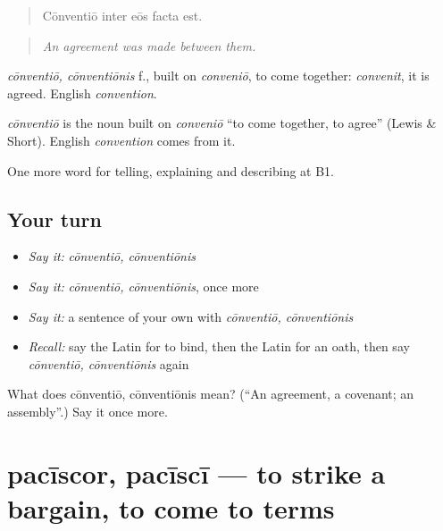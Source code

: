 \begin{quote}
Cōnventiō inter eōs facta est.
\end{quote}

\begin{quote}
\emph{An agreement was made between them.}
\end{quote}

\emph{cōnventiō, cōnventiōnis} f., built on \emph{conveniō}, to come together: \emph{convenit}, it is agreed. English \emph{convention}.

\begin{cousinweb}
\emph{cōnventiō} is the noun built on \emph{conveniō} \textquotedblleft{}to come together, to agree\textquotedblright{} (Lewis \& Short). English \emph{convention} comes from it.
\end{cousinweb}

\begin{grammarlens}[title={What you've built}]
One more word for telling, explaining and describing at B1.
\end{grammarlens}

\subsection*{Your turn}
\begin{itemize}
\raggedright
  \item \emph{Say it:} \emph{cōnventiō, cōnventiōnis}
  \item \emph{Say it:} \emph{cōnventiō, cōnventiōnis}, once more
  \item \emph{Say it:} a sentence of your own with \emph{cōnventiō, cōnventiōnis}
  \item \emph{Recall:} say the Latin for to bind, then the Latin for an oath, then say \emph{cōnventiō, cōnventiōnis} again
\end{itemize}

\begin{tcolorbox}[breakable,colback=teal!4,colframe=teal!35!black,title={Before you move on}]
What does cōnventiō, cōnventiōnis mean? (\textquotedblleft{}An agreement, a covenant; an assembly\textquotedblright{}.) Say it once more.
\end{tcolorbox}
\section[pacīscor, pacīscī]{pacīscor, pacīscī — to strike a bargain, to come to terms}

\label{lesson:LA-C397-paciscor}




